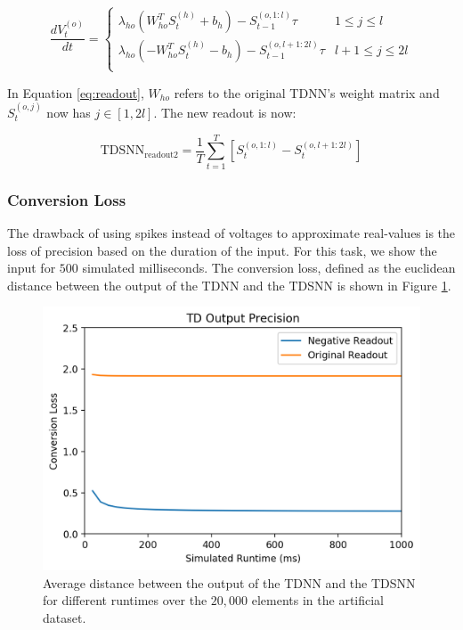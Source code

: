 \documentclass{article}
\begin{document}
\begin{equation}
    \frac{dV^{\left(o\right)}_t}{dt} = 
    \begin{cases} \lambda_{ho} \left(W_{ho}^TS^{\left(h\right)}_{t} + b_h\right) - S^{\left(o,1:l\right)}_{t-1} \tau & 1 \leq j \leq l  \\
      \lambda_{ho} \left(-W_{ho}^TS^{\left(h\right)}_{t} - b_h\right) - S^{\left(o,l+1:2l\right)}_{t-1} \tau & l+1 \leq j \leq 2l \\ \end{cases}
    \label{eq:readout}
\end{equation}

In Equation \ref{eq:readout}, $W_{ho}$ refers to the original TDNN's weight matrix and $S^{\left(o,j\right)}_{t}$ now has $j \in [1, 2l]$. The new readout is now:

\begin{equation}
    \text{TDSNN}_{\text{readout2}} = \frac{1}{T} \sum_{t=1}^{T}{\left[S_t^{\left(o,1:l\right)} - S_t^{\left(o,l+1:2l\right)}\right]}
\end{equation}

\subsubsection*{Conversion Loss}
The drawback of using spikes instead of voltages to approximate real-values is the loss of precision based on the duration of the input. For this task, we show the input for $500$ simulated milliseconds. The conversion loss, defined as the euclidean distance between the output of the TDNN and the TDSNN is shown in Figure \ref{fig:clfig}.

\begin{figure}[H]
    \centering
    \includegraphics[width=0.8\linewidth]{../results/conversion-loss.png}
    \caption{Average distance between the output of the TDNN and the TDSNN for different runtimes over the $20,000$ elements in the artificial dataset.}
    \label{fig:clfig}
\end{figure}
\end{document}
